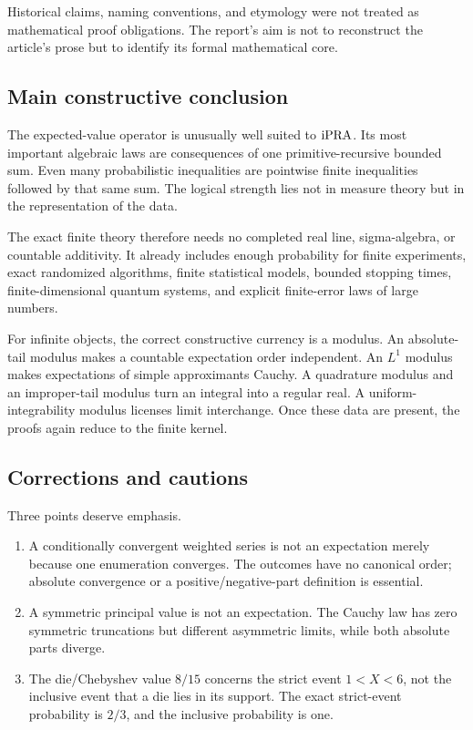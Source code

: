 Historical claims, naming conventions, and etymology were not treated as
mathematical proof obligations.  The report's aim is not to reconstruct the
article's prose but to identify its formal mathematical core.

\subsection{Main constructive conclusion}

The expected-value operator is unusually well suited to \(\mathrm{iPRA}\).  Its most
important algebraic laws are consequences of one primitive-recursive bounded
sum.  Even many probabilistic inequalities are pointwise finite inequalities
followed by that same sum.  The logical strength lies not in measure theory but
in the representation of the data.

The exact finite theory therefore needs no completed real line, sigma-algebra,
or countable additivity.  It already includes enough probability for
finite experiments, exact randomized algorithms, finite statistical models,
bounded stopping times, finite-dimensional quantum systems, and explicit
finite-error laws of large numbers.

For infinite objects, the correct constructive currency is a modulus.  An
absolute-tail modulus makes a countable expectation order independent.  An
\(L^1\) modulus makes expectations of simple approximants Cauchy.  A quadrature
modulus and an improper-tail modulus turn an integral into a regular real.  A
uniform-integrability modulus licenses limit interchange.  Once these data are
present, the proofs again reduce to the finite kernel.

\subsection{Corrections and cautions}

Three points deserve emphasis.

\begin{enumerate}
\item A conditionally convergent weighted series is not an expectation merely
  because one enumeration converges.  The outcomes have no canonical order;
  absolute convergence or a positive/negative-part definition is essential.
\item A symmetric principal value is not an expectation.  The Cauchy law has
  zero symmetric truncations but different asymmetric limits, while both
  absolute parts diverge.
\item The die/Chebyshev value \(8/15\) concerns the strict event
  \(1<X<6\), not the inclusive event that a die lies in its support.  The
  exact strict-event probability is \(2/3\), and the inclusive probability is
  one.
\end{enumerate}

